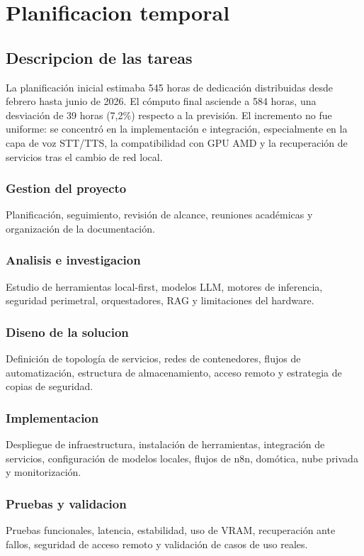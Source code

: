 \chapter{Planificacion temporal}

\section{Descripcion de las tareas}
La planificación inicial estimaba 545 horas de dedicación distribuidas desde febrero hasta junio de 2026. El cómputo final asciende a 584 horas, una desviación de 39 horas (7,2\%) respecto a la previsión. El incremento no fue uniforme: se concentró en la implementación e integración, especialmente en la capa de voz STT/TTS, la compatibilidad con GPU AMD y la recuperación de servicios tras el cambio de red local.

\subsection{Gestion del proyecto}
Planificación, seguimiento, revisión de alcance, reuniones académicas y organización de la documentación.

\subsection{Analisis e investigacion}
Estudio de herramientas local-first, modelos LLM, motores de inferencia, seguridad perimetral, orquestadores, RAG y limitaciones del hardware.

\subsection{Diseno de la solucion}
Definición de topología de servicios, redes de contenedores, flujos de automatización, estructura de almacenamiento, acceso remoto y estrategia de copias de seguridad.

\subsection{Implementacion}
Despliegue de infraestructura, instalación de herramientas, integración de servicios, configuración de modelos locales, flujos de n8n, domótica, nube privada y monitorización.

\subsection{Pruebas y validacion}
Pruebas funcionales, latencia, estabilidad, uso de VRAM, recuperación ante fallos, seguridad de acceso remoto y validación de casos de uso reales.

